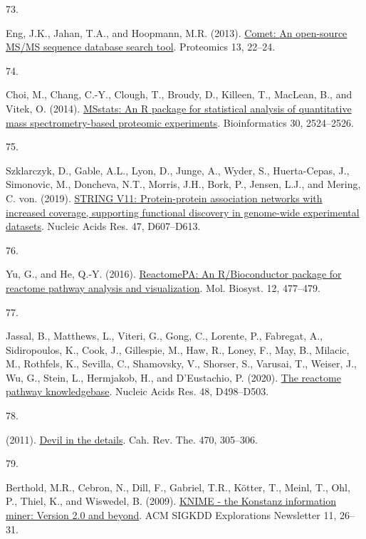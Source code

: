 \documentclass[
]{article}
\newlength{\cslhangindent}
\newlength{\csllabelwidth}
\newlength{\cslentryspacingunit} %
\newenvironment{CSLReferences}[2] %
 {%
  \setlength{\parindent}{0pt}
  \ifodd #1
  \let\oldpar\par
  \def\par{\hangindent=\cslhangindent\oldpar}
  \fi
  \setlength{\parskip}{#2\cslentryspacingunit}
 }%
 {}
\newcommand{\CSLLeftMargin}[1]{\parbox[t]{\csllabelwidth}{#1}}
\newcommand{\CSLRightInline}[1]{\parbox[t]{\linewidth - \csllabelwidth}{#1}\break}
\begin{document}
\begin{CSLReferences}{0}{0}
\leavevmode{}%
\CSLLeftMargin{73. }
\CSLRightInline{Eng, J.K., Jahan, T.A., and Hoopmann, M.R. (2013). \href{https://doi.org/10.1002/pmic.201200439}{Comet: {An} open-source {MS}/{MS} sequence database search tool}. Proteomics 13, 22--24.}

\leavevmode{}%
\CSLLeftMargin{74. }
\CSLRightInline{Choi, M., Chang, C.-Y., Clough, T., Broudy, D., Killeen, T., MacLean, B., and Vitek, O. (2014). \href{https://doi.org/10.1093/bioinformatics/btu305}{{MSstats}: An {R} package for statistical analysis of quantitative mass spectrometry-based proteomic experiments}. Bioinformatics 30, 2524--2526.}

\leavevmode{}%
\CSLLeftMargin{75. }
\CSLRightInline{Szklarczyk, D., Gable, A.L., Lyon, D., Junge, A., Wyder, S., Huerta-Cepas, J., Simonovic, M., Doncheva, N.T., Morris, J.H., Bork, P., Jensen, L.J., and Mering, C. von. (2019). \href{https://doi.org/10.1093/nar/gky1131}{{STRING} V11: Protein-protein association networks with increased coverage, supporting functional discovery in genome-wide experimental datasets}. Nucleic Acids Res. 47, D607--D613.}

\leavevmode{}%
\CSLLeftMargin{76. }
\CSLRightInline{Yu, G., and He, Q.-Y. (2016). \href{https://doi.org/10.1039/c5mb00663e}{{ReactomePA}: An {R}/{Bioconductor} package for reactome pathway analysis and visualization}. Mol. Biosyst. 12, 477--479.}

\leavevmode{}%
\CSLLeftMargin{77. }
\CSLRightInline{Jassal, B., Matthews, L., Viteri, G., Gong, C., Lorente, P., Fabregat, A., Sidiropoulos, K., Cook, J., Gillespie, M., Haw, R., Loney, F., May, B., Milacic, M., Rothfels, K., Sevilla, C., Shamovsky, V., Shorser, S., Varusai, T., Weiser, J., Wu, G., Stein, L., Hermjakob, H., and D'Eustachio, P. (2020). \href{https://doi.org/10.1093/nar/gkz1031}{The reactome pathway knowledgebase}. Nucleic Acids Res. 48, D498--D503.}

\leavevmode{}%
\CSLLeftMargin{78. }
\CSLRightInline{(2011). \href{https://doi.org/10.1038/470305b}{Devil in the details}. Cah. Rev. The. 470, 305--306.}

\leavevmode{}%
\CSLLeftMargin{79. }
\CSLRightInline{Berthold, M.R., Cebron, N., Dill, F., Gabriel, T.R., Kötter, T., Meinl, T., Ohl, P., Thiel, K., and Wiswedel, B. (2009). \href{https://doi.org/10.1145/1656274.1656280}{{KNIME} - the {Konstanz} information miner: Version 2.0 and beyond}. ACM SIGKDD Explorations Newsletter 11, 26--31.}


\end{CSLReferences}
\end{document}
